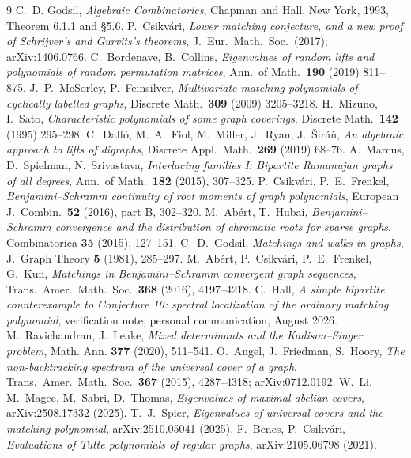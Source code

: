 \documentclass[11pt]{article}
\theoremstyle{remark}
\begin{document}
\begin{thebibliography}{9}
 C.~D. Godsil, \emph{Algebraic Combinatorics}, Chapman and Hall,
New York, 1993, Theorem 6.1.1 and \S5.6.
 P.~Csikv\'ari, \emph{Lower matching conjecture, and a new proof of
Schrijver's and Gurvits's theorems}, J.\ Eur.\ Math.\ Soc.\ (2017);
arXiv:1406.0766.
 C.~Bordenave, B.~Collins, \emph{Eigenvalues of random lifts and
polynomials of random permutation matrices}, Ann.\ of Math.\ \textbf{190}
(2019) 811--875.
 J.~P.~McSorley, P.~Feinsilver, \emph{Multivariate matching
polynomials of cyclically labelled graphs}, Discrete Math.\ \textbf{309} (2009)
3205--3218.
 H.~Mizuno, I.~Sato, \emph{Characteristic polynomials of some graph
coverings}, Discrete Math.\ \textbf{142} (1995) 295--298.
 C.~Dalf\'o, M.~A.~Fiol, M.~Miller, J.~Ryan, J.~\v{S}ir\'a\v{n},
\emph{An algebraic approach to lifts of digraphs}, Discrete Appl.\ Math.\
\textbf{269} (2019) 68--76.
 A.~Marcus, D.~Spielman, N.~Srivastava, \emph{Interlacing
families I: Bipartite Ramanujan graphs of all degrees}, Ann.\ of Math.\
\textbf{182} (2015), 307--325.
\bibitem{CsF} P.~Csikv\'ari, P.~E.~Frenkel, \emph{Benjamini--Schramm continuity
of root moments of graph polynomials}, European J.\ Combin.\ \textbf{52} (2016),
part B, 302--320.
\bibitem{AH} M.~Ab\'ert, T.~Hubai, \emph{Benjamini--Schramm convergence and the
distribution of chromatic roots for sparse graphs}, Combinatorica \textbf{35}
(2015), 127--151.
\bibitem{Go} C.~D.~Godsil, \emph{Matchings and walks in graphs}, J.\ Graph
Theory \textbf{5} (1981), 285--297.
\bibitem{ACFK} M.~Ab\'ert, P.~Csikv\'ari, P.~E.~Frenkel, G.~Kun, \emph{Matchings
in Benjamini--Schramm convergent graph sequences}, Trans.\ Amer.\ Math.\ Soc.\
\textbf{368} (2016), 4197--4218.
\bibitem{HallCE} C.~Hall, \emph{A simple bipartite counterexample to Conjecture 10:
  spectral localization of the ordinary matching polynomial}, verification note, personal
  communication, August 2026.
\bibitem{RL} M.~Ravichandran, J.~Leake, \emph{Mixed determinants and the Kadison--Singer
  problem}, Math. Ann. \textbf{377} (2020), 511--541.
\bibitem{AFH} O.~Angel, J.~Friedman, S.~Hoory, \emph{The non-backtracking spectrum of the
  universal cover of a graph}, Trans.\ Amer.\ Math.\ Soc.\ \textbf{367} (2015), 4287--4318;
  arXiv:0712.0192.
\bibitem{LMST} W.~Li, M.~Magee, M.~Sabri, D.~Thomas, \emph{Eigenvalues of maximal
  abelian covers}, arXiv:2508.17332 (2025).
\bibitem{Sp} T.~J.~Spier, \emph{Eigenvalues of universal covers and the matching
  polynomial}, arXiv:2510.05041 (2025).
\bibitem{BCs} F.~Bencs, P.~Csikv\'ari, \emph{Evaluations of Tutte polynomials of
regular graphs}, arXiv:2105.06798 (2021).
\end{thebibliography}
\end{document}
